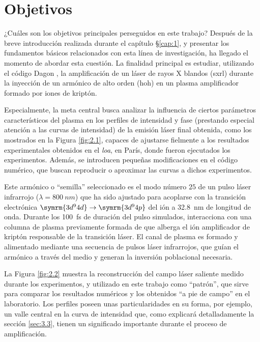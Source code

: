 \chapter{Objetivos}\label{cap:2}
¿Cuáles son los objetivos principales perseguidos en este trabajo? Después de la breve introducción realizada durante el capítulo \S\ref{cap:1}, y presentar los fundamentos básicos relacionados con esta línea de investigación, ha llegado el momento de abordar esta cuestión. La finalidad principal es estudiar, utilizando el código Dagon \autocite{Oliva2017}, la amplificación de un láser de rayos X blandos (\acrshort{sxrl}) durante la inyección de un armónico de alto orden (\acrshort{hoh}) en un plasma amplificador formado por iones de kriptón.

Especialmente, la meta central busca analizar la influencia de ciertos parámetros característicos del plasma en los perfiles de intensidad y fase (prestando especial atención a las curvas de intensidad) de la emisión láser final obtenida, como los mostrados en la Figura \ref{fig:2.1}, capaces de ajustarse fielmente a los resultados experimentales obtenidos en el \emph{\acrfull{loa}}, en París, donde fueron ejecutados los experimentos. Además, se introducen pequeñas modificaciones en el código numérico, que buscan reproducir o aproximar las curvas a dichos experimentos.

Este armónico o \enquote{semilla} seleccionado es el modo número $25$ de un pulso láser infrarrojo ($\lambda = \qty{800}{nm}$) que ha sido ajustado para acoplarse con la transición electrónica $\symrm{3d^{9}4d} \rightarrow \symrm{3d^{9}4p}$ del ión  a \qty{32.8}{nm} de longitud de onda. Durante los \qty{100}{fs} de duración del pulso simulados, interacciona con una columna de plasma previamente formada de  que alberga el ión amplificador de kriptón  responsable de la transición láser. El canal de plasma es formado y alimentado mediante una secuencia de pulsos láser infrarrojos, que guían el armónico a través del medio y generan la inversión poblacional necesaria.

La Figura \ref{fig:2.2} muestra la reconstrucción del campo láser saliente medido durante los experimentos, y utilizado en este trabajo como \enquote{patrón}, que sirve para comparar los resultados numéricos y los obtenidos \enquote{a pie de campo} en el laboratorio. Los perfiles poseen unas particularidades en su forma, por ejemplo, un valle central en la curva de intensidad que, como explicará detalladamente la sección \ref{sec:3.3}, tienen un significado importante durante el proceso de amplificación.

